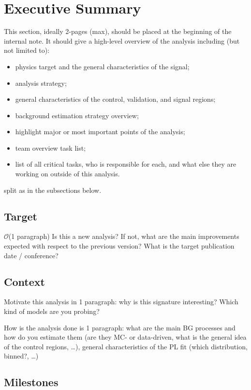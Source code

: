 \section{Executive Summary}

This section, ideally 2-pages (max), should be placed at the beginning of the internal note.
It should give a high-level overview of the analysis including (but not limited to):
\begin{itemize}
\item physics target and the general characteristics of the signal;
\item analysis strategy;
\item general characteristics of the control, validation, and signal regions;
\item background estimation strategy overview;
\item highlight major or most important points of the analysis;
\item team overview task list;
\item list of all critical tasks, who is responsible for each, and what else they are working on outside of this analysis.
\end{itemize}
split as in the subsections below.

\subsection{Target} 

\(\mathcal{O}\)(1 paragraph)
Is this a new analysis? If not, what are the main improvements expected with respect to the previous version?
What is the target publication date / conference?

\subsection{Context} 

Motivate this analysis in 1 paragraph: why is this signature interesting? Which kind of models are you probing?

How is the analysis done is 1 paragraph: what are the main BG processes and how do you estimate them (are they MC- or data-driven,
what is the general idea of the control regions, \ldots), general characteristics of the PL fit (which distribution, binned?, \ldots)

\subsection{Milestones}

